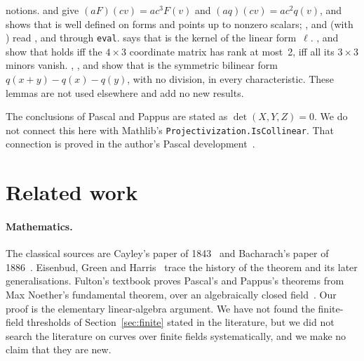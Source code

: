 \documentclass[11pt]{article}
\theoremstyle{definition}
\theoremstyle{remark}
\newcommand{\lean}[1]{\texttt{#1}}
\begin{document}
notions.  and  give $(aF)(cv)=ac^3F(v)$ and
$(aq)(cv)=ac^2q(v)$, and  shows that  is well defined
on forms and points up to nonzero scalars; ,  and
 (with ) read ,
 and  through \lean{eval}.  says
that  is the kernel of the linear form~$\ell$. ,
 and  show that  holds iff the
$4\times3$ coordinate matrix has rank at most~2, iff all its $3\times3$ minors vanish.
, ,  and  show that
 is the symmetric bilinear form $q(x+y)-q(x)-q(y)$, with no division, in every
characteristic. These lemmas are not used elsewhere and add no new results.

The conclusions of Pascal and Pappus are stated as $\det(X,Y,Z)=0$. We do not connect this here
with Mathlib's \lean{Projectivization.IsCollinear}. That connection is proved in the author's
Pascal development~\cite{PascalHexagon}.

\section{Related work}\label{sec:related}

\paragraph{Mathematics.} The classical sources are Cayley's paper of 1843~\cite{Cayley} and
Bacharach's paper of 1886~\cite{Bacharach}. Eisenbud, Green and Harris~\cite{EGH} trace the
history of the theorem and its later generalisations. Fulton's textbook
proves Pascal's and Pappus's theorems from Max Noether's fundamental theorem, over an
algebraically closed field~\cite[\S5.6]{Fulton}. Our proof is the elementary linear-algebra
argument. We have not found the finite-field thresholds of Section~\ref{sec:finite} stated in the
literature, but we did not search the literature on curves over finite fields systematically,
and we make no claim that they are new.
\end{document}
